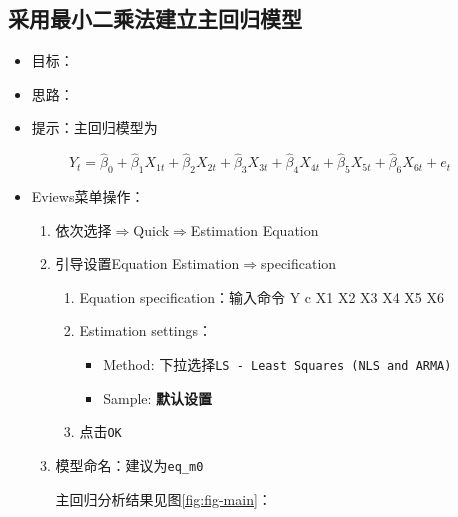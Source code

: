 \documentclass[12pt,(landscape,a4paper),(portrait,a4paper)]{article}
\providecommand{\tightlist}{%
  \setlength{\itemsep}{0pt}\setlength{\parskip}{0pt}}
\begin{document}
\subsection{采用最小二乘法建立主回归模型}

\begin{itemize}
\tightlist
\item
  目标：
\item
  思路：
\item
  提示：主回归模型为
\end{itemize}

\[Y_t=\hat{\beta}_0+\hat{\beta}_1X_{1t}+\hat{\beta}_2X_{2t}+\hat{\beta}_3X_{3t}+\hat{\beta}_4X_{4t}+\hat{\beta}_5X_{5t}+\hat{\beta}_6X_{6t}+e_{t}\]

\begin{itemize}
\tightlist
\item
  Eviews菜单操作：

  \begin{enumerate}
  \def\labelenumi{\arabic{enumi})}
  \item
    依次选择\(\Rightarrow\)Quick\(\Rightarrow\)Estimation Equation\\
  \item
    引导设置Equation Estimation\(\Rightarrow\)specification

    \begin{enumerate}
    \def\labelenumii{\alph{enumii}.}
    \tightlist
    \item
      Equation specification：输入命令 Y c X1 X2 X3 X4 X5 X6
    \item
      Estimation settings：

      \begin{itemize}
      \tightlist
      \item
        Method: 下拉选择\texttt{LS\ -\ Least\ Squares\ (NLS\ and\ ARMA)}
      \item
        Sample: \textbf{默认设置}
      \end{itemize}
    \item
      点击\texttt{OK}\\
    \end{enumerate}
  \item
    模型命名：建议为\texttt{eq\_m0}

    主回归分析结果见图\ref{fig:fig-main}：
  \end{enumerate}
\end{itemize}
\end{document}
